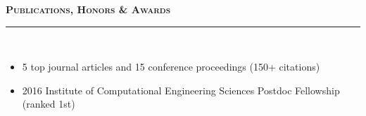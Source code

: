 \documentclass[11pt]{article}
\begin{document}
\vspace{-10pt}



%

\vspace{6pt}

\textbf{\textsc{\LARGE{Publications, Honors \& Awards}}} \\ \rule[0.8em]{\textwidth}{0.5pt} \\[-18pt]

\begin{itemize}[topsep=0pt,partopsep=0pt,leftmargin=16pt]
\item 5 top journal articles and 15 conference proceedings (150+ citations) 
\item 2016 Institute of Computational Engineering Sciences Postdoc Fellowship (ranked 1st)
\end{itemize}

\vspace{2pt}
%
\end{document}
